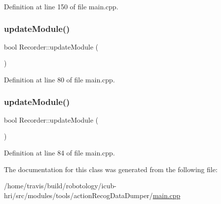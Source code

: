 Definition at line 150 of file main.\+cpp.

\mbox{\label{classRecorder_a0689f290ac7e49caabe3926fbd703b12}} 
\subsubsection{\texorpdfstring{update\+Module()}{updateModule()}\hspace{0.1cm}{\footnotesize\ttfamily [1/2]}}
{\footnotesize\ttfamily bool Recorder\+::update\+Module (\begin{DoxyParamCaption}{ }\end{DoxyParamCaption})\hspace{0.3cm}{\ttfamily [inline]}}



Definition at line 80 of file main.\+cpp.

\mbox{\label{classRecorder_a0689f290ac7e49caabe3926fbd703b12}} 
\subsubsection{\texorpdfstring{update\+Module()}{updateModule()}\hspace{0.1cm}{\footnotesize\ttfamily [2/2]}}
{\footnotesize\ttfamily bool Recorder\+::update\+Module (\begin{DoxyParamCaption}{ }\end{DoxyParamCaption})\hspace{0.3cm}{\ttfamily [inline]}}



Definition at line 84 of file main.\+cpp.



The documentation for this class was generated from the following file\+:\begin{DoxyCompactItemize}
\item 
/home/travis/build/robotology/icub-\/hri/src/modules/tools/action\+Recog\+Data\+Dumper/\hyperlink{modules_2tools_2actionRecogDataDumper_2main_8cpp}{main.\+cpp}\end{DoxyCompactItemize}
